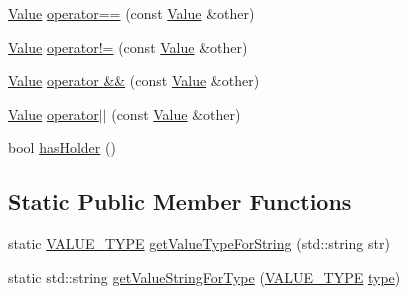 \begin{DoxyCompactItemize}
\item 
\hyperlink{classValue}{Value} \hyperlink{classValue_a872c51bf32543279f522426527b4c857}{operator==} (const \hyperlink{classValue}{Value} \&other)
\item 
\hyperlink{classValue}{Value} \hyperlink{classValue_a9ad57dde72c068377e6da67caec558a3}{operator!=} (const \hyperlink{classValue}{Value} \&other)
\item 
\hyperlink{classValue}{Value} \hyperlink{classValue_a8550d0a2396c3222421fdd1aef7ff49b}{operator \&\&} (const \hyperlink{classValue}{Value} \&other)
\item 
\hyperlink{classValue}{Value} \hyperlink{classValue_a2bb40009194bb698b113dc71154d888a}{operator$\vert$$\vert$} (const \hyperlink{classValue}{Value} \&other)
\item 
bool \hyperlink{classValue_a9193333ebda6a44b426ebc24519473db}{has\+Holder} ()
\end{DoxyCompactItemize}
\subsection*{Static Public Member Functions}
\begin{DoxyCompactItemize}
\item 
static \hyperlink{statics_8h_a0674a913b8e8c8a9f265baab3646b565}{V\+A\+L\+U\+E\+\_\+\+T\+Y\+PE} \hyperlink{classValue_a4f772a945a39235b058b18cc187f64a8}{get\+Value\+Type\+For\+String} (std\+::string str)
\item 
static std\+::string \hyperlink{classValue_ad1e0a7607c63edbe77251059d433914e}{get\+Value\+String\+For\+Type} (\hyperlink{statics_8h_a0674a913b8e8c8a9f265baab3646b565}{V\+A\+L\+U\+E\+\_\+\+T\+Y\+PE} \hyperlink{classValue_a4ee4412ce2c7b78bad42d8eb93294bea}{type})
\end{DoxyCompactItemize}
